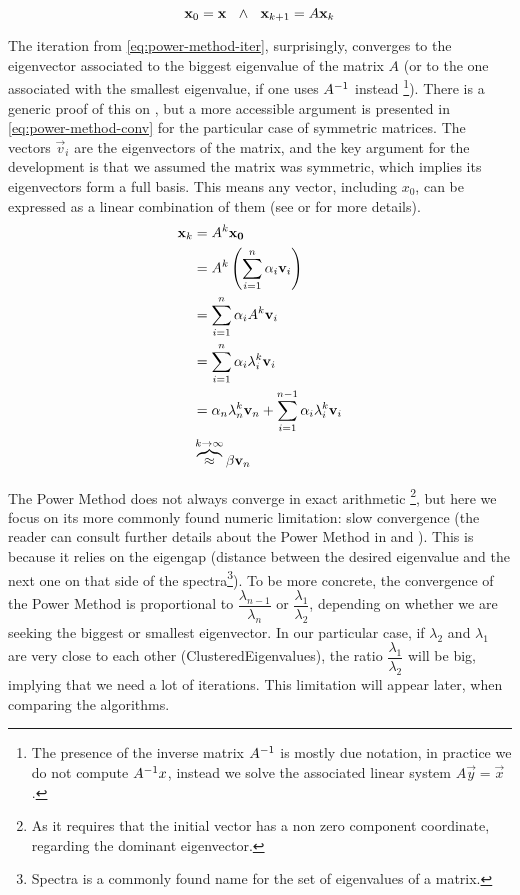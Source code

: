 \begin{equation}
  \label{eq:power-method-iter}
    \vec{x}_0 = \vec{x} \ds{\ds{\land}}
    \vec{x}_{k+1} = A\vec{x}_k  
\end{equation}
\joinbelow{1cm}

The iteration from \cref{eq:power-method-iter}, surprisingly,
converges to the eigenvector 
associated to the biggest eigenvalue of the matrix $A$ (or to the one
associated with the smallest eigenvalue, if one uses ${A}^{-1}$ instead
\footnote{The presence of the inverse matrix ${A}^{-1}$ is mostly due
  notation, in practice we do not compute ${A}^{-1}x$, instead we solve the
  associated linear system $A\vec{y} = \vec{x}$.}). There is a
generic proof of this on \cite{saad92}, but a more accessible argument
is presented in \cref{eq:power-method-conv} for the particular case of
symmetric matrices. The vectors 
$\vec{v}_i$ are the eigenvectors of the matrix, and the key argument
for the development is that we
assumed the  matrix was symmetric, which implies its eigenvectors form a full
basis. This means any vector, including $x_0$, can be expressed as a
linear combination of them (see \cite{strang88} or \cite{golub13} for
more details). \\

\begin{align}
  \begin{split}
  \label{eq:power-method-conv}
  \vec{x}_k &= A^{k}\vec{x_0} \\
  &= A^{k}\left(\sum\limits_{\tiny{i=1}}^{n} \alpha_i\vec{v}_i \right) \\
  &= \sum\limits_{\tiny{i=1}}^{n} \alpha_i A^{k} \vec{v}_i  \\
  &= \sum\limits_{\tiny{i=1}}^{n} \alpha_i \lambda_i^{k} \vec{v}_i \\
  &= \alpha_n \lambda_n^{k} \vec{v}_n +
  \sum\limits_{\tiny{i=1}}^{n-1} \alpha_i \lambda_i^{k} \vec{v}_i \\
  & \overbrace{\approx}^{k \to \infty} \beta \vec{v}_n  
  \end{split}
\end{align}


The Power Method does not always converge in exact
arithmetic \footnote{As it requires that the initial vector has a non
  zero component coordinate, regarding the dominant eigenvector.}, but
here we focus on its 
more commonly found numeric limitation: slow convergence (the reader
can consult further details about the Power Method in \cite{golub13}
and \cite{parlett80}). This is
because it relies on the eigengap (distance between the desired eigenvalue and
the next one on that side of the spectra\footnote{Spectra is a
  commonly found name for the set of eigenvalues of a matrix.}). To be
more concrete, the convergence of the Power Method is proportional to
$\dfrac{\lambda_{n-1}}{\lambda_n}$ or $\dfrac{\lambda_1}{\lambda_2}$,
depending on whether we are seeking the  biggest or smallest
eigenvector. In our particular case, if $\lambda_2$ and $\lambda_1$ are very close to each other (\gls{ClusteredEigenvalues}), the ratio $\dfrac{\lambda_1}{\lambda_2}$ will be big, implying that we need a lot of iterations. This limitation will appear later, when comparing the algorithms.

